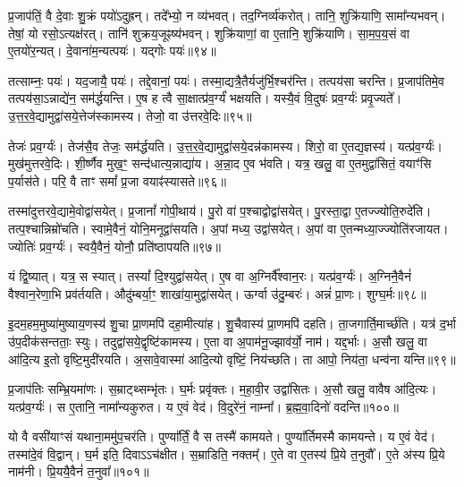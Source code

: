 प्र॒जाप॑तिं॒ वै दे॒वाः  शु॒क्रं पयो॑ऽदुह्रन्। 
तदे᳚भ्यो॒ न व्य॑भवत्। 
तद॒ग्निर्व्य॑करोत्। 
तानि॒ शुक्रि॑याणि॒ सामा᳚न्यभवन्। 
तेषां॒ यो रसो॒ऽत्यक्ष॑रत्। 
तानि॑ शुक्रय॒जूꣴष्य॑भवन्। 
शुक्रि॑याणां॒ वा ए॒तानि॒ शुक्रि॑याणि। 
सा॒म॒प॒य॒सं वा ए॒तयो॑र॒न्यत्। 
दे॒वाना॑म॒न्यत्पयः॑। 
यद्गोः पयः॑॥९४॥

तत्साम्नः॒ पयः॑। 
यद॒जायै॒ पयः॑। 
तद्दे॒वानां॒ पयः॑। 
तस्मा॒द्यत्रै॒तैर्यजु॑र्भि॒\-श्चर॑न्ति। 
तत्पय॑सा चरन्ति। 
प्र॒जाप॑तिमे॒व तत्पय॑सा॒ऽन्नाद्ये॑न॒ सम॑र्द्धयन्ति। 
ए॒ष ह त्वै सा॒क्षात्प्र॑व॒र्ग्यं॑ भक्षयति। 
यस्यै॒वं  वि॒दुषः॑ प्रव॒र्ग्यः॑ प्रवृ॒ज्यते᳚। 
उ॒त्त॒र॒वे॒द्यामुद्वा॑स\-ये॒त्तेज॑स्कामस्य। 
तेजो॒ वा उ॑त्तरवे॒दिः॥९५॥

तेजः॑ प्रव॒र्ग्यः॑। 
तेज॑सै॒व तेजः॒ सम॑र्द्धयति। 
उ॒त्त॒र॒वे॒द्यामुद्वा॑सये॒\-दन्न॑\-कामस्य। 
शिरो॒ वा ए॒तद्य॒ज्ञस्य॑। 
यत्प्र॑व॒र्ग्यः॑। 
मुख॑मुत्तरवे॒दिः। 
शी॒र्ष्णैव मुख॒ꣳ॒ सन्द॑धात्य॒न्नाद्या॑य। 
अ॒न्ना॒द ए॒व भ॑वति। 
यत्र॒ खलु॒ वा ए॒तमुद्वा॑सितं॒ वयाꣳ॑सि प॒र्यास॑ते। 
परि॒ वै ताꣳ समां᳚ प्र॒जा वयाꣴ॑स्यासते॥९६॥

तस्मा॑दुत्तरवे॒द्यामे॒वोद्वा॑सयेत्। 
प्र॒जानां᳚ गोपी॒थाय॑। 
पु॒रो वा॑ प॒श्चाद्वोद्वा॑सयेत्। 
पु॒रस्ता॒द्वा ए॒तज्ज्योति॒रुदे॑ति। 
तत्प॒श्चान्निम्रो॑चति। 
स्वामे॒वैनं॒ योनि॒मनूद्वा॑सयति। 
अ॒पां मध्य॒ उद्वा॑सयेत्। 
अ॒पां वा ए॒तन्मध्या॒ज्ज्योति॑रजायत। 
ज्योतिः॑ प्रव॒र्ग्यः॑। 
स्वयै॒वैनं॒ योनौ॒ प्रति॑ष्ठापयति॥९७॥

यं द्वि॒ष्यात्। 
यत्र॒ स स्यात्। 
तस्यां᳚ दि॒श्युद्वा॑सयेत्। 
ए॒ष वा अ॒ग्निर्वै᳚श्वान॒रः। 
यत्प्र॑व॒र्ग्यः॑। 
अ॒ग्निनै॒वैनं॑ वैश्वान॒रेणा॒भि प्रव॑र्तयति। 
औदु॑म्बर्या॒ꣳ॒ शाखा॑या॒मुद्वा॑सयेत्। 
ऊर्ग्वा उ॑दु॒म्बरः॑। 
अन्नं॑ प्रा॒णः। 
शुग्घ॒र्मः॥९८॥

इ॒दम॒हम॒मुष्या॑मुष्याय॒णस्य॑ शु॒चा प्रा॒णमपि॑ दहा॒मीत्या॑ह। 
शु॒चैवास्य॑ प्रा॒णमपि॑ दहति। 
ता॒जगार्ति॒मार्च्छ॑ति। 
यत्र॑ द॒र्भा उ॑प॒दीक॑सन्तताः॒ स्युः। 
तदुद्वा॑सये॒द्वृष्टि॑कामस्य। 
ए॒ता वा अ॒पाम॑नू॒ज्झाव॑र्यो॒ नाम॑। 
यद्द॒र्भाः। 
अ॒सौ खलु॒ वा आ॑दि॒त्य इ॒तो वृष्टि॒मुदी॑रयति। 
अ॒सावे॒वास्मा॑ आदि॒त्यो वृष्टिं॒ निय॑च्छति। 
ता आपो॒ निय॑ता॒ धन्व॑ना यन्ति॥९९॥

प्र॒जाप॑तिः सम्भ्रि॒यमा॑णः। 
स॒म्राट्थ्सम्भृ॑तः। 
घ॒र्मः प्रवृ॑क्तः। 
म॒हा॒वी॒र उद्वा॑सितः। 
अ॒सौ खलु॒ वावैष आ॑दि॒त्यः। 
यत्प्र॑व॒र्ग्यः॑। 
स ए॒तानि॒ नामा᳚न्यकुरुत। 
य ए॒वं वेद॑। 
वि॒दुरे॑नं॒ नाम्ना᳚। 
ब्र॒ह्म॒वा॒दिनो॑ वदन्ति॥१००॥

यो वै वसी॑याꣳसं यथाना॒ममु॑प॒चर॑ति। 
पुण्या᳚र्तिं॒ वै स तस्मै॑ कामयते। 
पुण्या᳚र्तिमस्मै कामयन्ते। 
य ए॒वं वेद॑। 
तस्मा॑दे॒वं  वि॒द्वान्। 
घ॒र्म इति॒ दिवाऽऽच॑क्षीत। 
स॒म्राडिति॒ नक्तम्᳚। 
ए॒ते वा ए॒तस्य॑ प्रि॒ये त॒नुवौ᳚। 
ए॒ते अ॑स्य प्रि॒ये नाम॑नी। 
प्रि॒ययै॒वैनं॑ त॒नुवा᳚॥१०१॥

